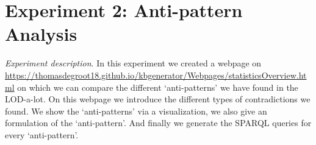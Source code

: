\documentclass[11pt,letterpaper ,oneside ]{book}
\begin{document}
\begin{table}[!t]
	\centering
	\caption{table showing the reasoners to test the pizza ontology.}
	\label{table:PizzaOntology}
\end{table}

\section{Experiment 2: Anti-pattern Analysis} %
\textit{Experiment description}. In this experiment we created a webpage on\\ \url{https://thomasdegroot18.github.io/kbgenerator/Webpages/statisticsOverview.html} on which we can compare the different `anti-patterns' we have found in the LOD-a-lot. On this webpage we introduce the different types of contradictions we found. We show the `anti-patterns' via a visualization, we also give an formulation of the `anti-pattern'. And finally we generate the SPARQL queries for every `anti-pattern'.  
\end{document}
